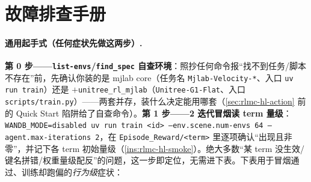 \section*{故障排查手册}

\paragraph{通用起手式（任何症状先做这两步）.}
\textbf{第 0 步——\texttt{list-envs}/\allowbreak\texttt{find\_spec} 自查环境}：照抄任何命令报“找不到任务/脚本不存在”前，先确认你装的是 mjlab core（任务名 \texttt{Mjlab-Velocity-*}、入口 \texttt{uv run train}）还是 $+$\texttt{unitree\_rl\_mjlab}（\texttt{Unitree-G1-Flat}、入口 \texttt{scripts/\allowbreak train.\allowbreak py}）——两套并存，装什么决定能用哪套（\cref{sec:rlmc-hl-action} 前的 Quick Start 陷阱给了自查命令）。\textbf{第 1 步——2 迭代冒烟读 term 量级}：\texttt{WANDB\_MODE=disabled uv run train <id> --env.\allowbreak scene.\allowbreak num-envs 64 --agent.\allowbreak max-iterations 2}，在 \texttt{Episode\_Reward/\allowbreak <term>} 里逐项确认“出现且非零”，并记下各 term 初始量级（\cref{ins:rlmc-hl-smoke}）。绝大多数“某 term 没生效/键名拼错/权重量级配反”的问题，这一步即定位，无需进下表。下表用于冒烟通过、训练却跑偏的\emph{行为级}症状：


